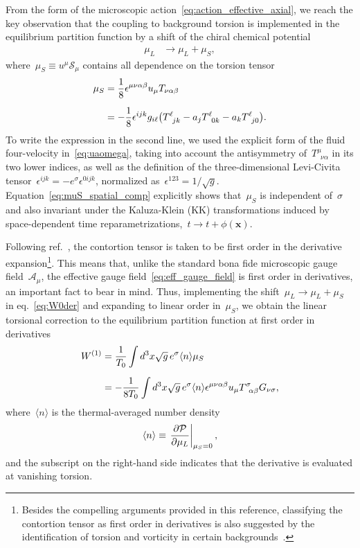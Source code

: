 \documentclass[11pt,a4paper]{article}
\begin{document}
From the form of the microscopic action~\eqref{eq:action_effective_axial}, 
we reach the key observation that the coupling to 
background torsion is implemented in the equilibrium partition function by a shift of the chiral
chemical potential
\begin{align}
\mu_{L}&\longrightarrow \mu_{L}
+\mu_{S},
\label{eq:shift}
\end{align} 
where~$\mu_{S}\equiv u^{\mu}\mathcal{S}_{\mu}$ contains all dependence on the torsion 
tensor~\cite{Manes:2020zdd}
\begin{align}
\mu_{S}&={1\over 8}\epsilon^{\mu\nu\alpha\beta}u_{\mu}T_{\nu\alpha\beta}
\nonumber \\[0.2cm]
&=-{1\over 8}\epsilon^{ijk}g_{i\ell}\big(T^{\ell}_{\,\,\,jk}-a_{j}T^{\ell}_{\,\,\,0k}-a_{k}T^{\ell}_{\,\,\,j0}\big).
\label{eq:muS_spatial_comp}
\end{align}
To write the expression in the second line, we used the explicit form of 
the fluid four-velocity in~\eqref{eq:uaomega},
taking into account the 
antisymmetry of~$T^{\mu}_{\,\,\,\nu\alpha}$ in its two lower indices, as well as the definition of the  
three-dimensional Levi-Civita tensor~$\epsilon^{ijk}=-e^{\sigma}\epsilon^{0ijk}$, 
normalized as~$\epsilon^{123}=1/\sqrt{g}$.
Equation~\eqref{eq:muS_spatial_comp} explicitly shows that~$\mu_{S}$ is independent of~$\sigma$
and also invariant
under the Kaluza-Klein (KK) transformations induced by 
space-dependent time reparametrizations,~$t\rightarrow
t+\phi(\mathbf{x})$.

Following ref.~\cite{Gallegos:2022jow}, the contortion tensor is taken to be first order in the 
derivative expansion\footnote{Besides the compelling arguments provided in this reference, classifying the contortion tensor as first order
in derivatives is also suggested by the identification
of torsion and vorticity in certain backgrounds~\cite{Khaidukov:2018oat}.}.
This means that, unlike the standard bona fide microscopic 
gauge field~$\mathcal{A}_{\mu}$, the effective gauge field~\eqref{eq:eff_gauge_field}
is first order in derivatives, an important fact to bear in mind. 
Thus, implementing the shift~$\mu_{L}\rightarrow\mu_{L}+\mu_{S}$ in eq.~\eqref{eq:W0der} and expanding
to linear order in~$\mu_{S}$, we obtain the linear torsional correction to the equilibrium partition function 
at first order in derivatives
\begin{align}
W^{(1)}&={1\over T_{0}}\int d^{3}x\sqrt{g}\,e^{\sigma}\langle n\rangle \mu_{S} \nonumber \\[0.2cm]
&=-{1\over 8T_{0}}\int d^{3}x\sqrt{g}\,e^{\sigma}\langle n\rangle \epsilon^{\mu\nu\alpha\beta}u_{\mu}
T^{\sigma}_{\,\,\,\alpha\beta}G_{\nu\sigma},
\label{eq:W(1)}
\end{align}
where~$\langle n\rangle$ is the thermal-averaged number density
\begin{align}
\langle n \rangle\equiv\left. {\partial \mathcal{P}\over \partial \mu_{L}}\right|_{\mu_{S}=0},
\label{eq:<n>_def}
\end{align}
and the subscript on the right-hand side indicates that the derivative is evaluated at vanishing torsion. 
\end{document}
